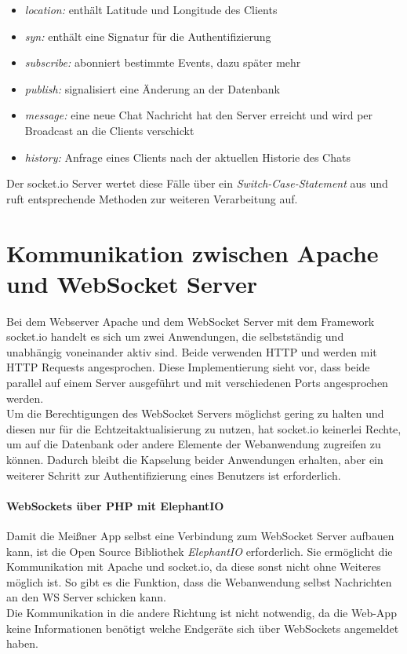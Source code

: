 \begin{itemize}
	\item[] \emph{location:} enthält Latitude und Longitude des Clients
	\item[] \emph{syn:} enthält eine Signatur für die Authentifizierung
	\item[] \emph{subscribe:} abonniert bestimmte Events, dazu später mehr
	\item[] \emph{publish:} signalisiert eine Änderung an der Datenbank
	\item[] \emph{message:} eine neue Chat Nachricht hat den Server erreicht und wird per Broadcast an die Clients verschickt
	\item[] \emph{history:} Anfrage eines Clients nach der aktuellen Historie des Chats
\end{itemize}

Der socket.io Server wertet diese Fälle über ein \emph{Switch-Case-Statement} aus und ruft entsprechende Methoden zur weiteren Verarbeitung auf.


\section{Kommunikation zwischen Apache und WebSocket Server}
Bei dem Webserver Apache und dem WebSocket Server mit dem Framework socket.io handelt es sich um zwei Anwendungen, die selbstständig und unabhängig voneinander aktiv sind. Beide verwenden HTTP und werden mit HTTP Requests angesprochen. Diese Implementierung sieht vor, dass beide parallel auf einem Server ausgeführt und mit verschiedenen Ports angesprochen werden.\\
Um die Berechtigungen des WebSocket Servers möglichst gering zu halten und diesen nur für die Echtzeitaktualisierung zu nutzen, hat socket.io keinerlei Rechte, um auf die Datenbank oder andere Elemente der Webanwendung zugreifen zu können. Dadurch bleibt die Kapselung beider Anwendungen erhalten, aber ein weiterer Schritt zur Authentifizierung eines Benutzers ist erforderlich.

\paragraph{WebSockets über PHP mit ElephantIO}
Damit die Meißner App selbst eine Verbindung zum WebSocket Server aufbauen kann, ist die Open Source Bibliothek \emph{ElephantIO} \cite{elephant.io} erforderlich. Sie ermöglicht die Kommunikation mit Apache und socket.io, da diese sonst nicht ohne Weiteres möglich ist. So gibt es die Funktion, dass die Webanwendung selbst Nachrichten an den WS Server schicken kann.\\
Die Kommunikation in die andere Richtung ist nicht notwendig, da die Web-App keine Informationen benötigt welche Endgeräte sich über WebSockets angemeldet haben.

